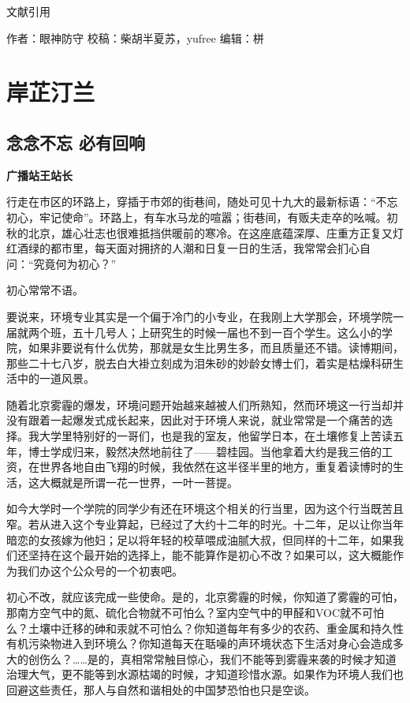 \documentclass[]{book}
\begin{document}
文献引用

作者：眼神防守 校稿：柴胡半夏苏，yufree 编辑：栟

\chapter{岸芷汀兰}

\section{念念不忘 必有回响}\label{-}

\textbf{广播站王站长}

行走在市区的环路上，穿插于市郊的街巷间，随处可见十九大的最新标语：``不忘初心，牢记使命''。环路上，有车水马龙的喧嚣；街巷间，有贩夫走卒的吆喊。初秋的北京，雄心壮志也很难抵挡供暖前的寒冷。在这座底蕴深厚、庄重方正复又灯红酒绿的都市里，每天面对拥挤的人潮和日复一日的生活，我常常会扪心自问：``究竟何为初心？''

初心常常不语。

要说来，环境专业其实是一个偏于冷门的小专业，在我刚上大学那会，环境学院一届就两个班，五十几号人；上研究生的时候一届也不到一百个学生。这么小的学院，如果非要说有什么优势，那就是女生比男生多，而且质量还不错。读博期间，那些二十七八岁，脱去白大褂立刻成为泪朱砂的妙龄女博士们，着实是枯燥科研生活中的一道风景。

随着北京雾霾的爆发，环境问题开始越来越被人们所熟知，然而环境这一行当却并没有跟着一起爆发式成长起来，因此对于环境人来说，就业常常是一个痛苦的选择。我大学里特别好的一哥们，也是我的室友，他留学日本，在土壤修复上苦读五年，博士学成归来，毅然决然地前往了------碧桂园。当他拿着大约是我三倍的工资，在世界各地自由飞翔的时候，我依然在这半径半里的地方，重复着读博时的生活，这大概就是所谓一花一世界，一叶一菩提。

如今大学时一个学院的同学少有还在环境这个相关的行当里，因为这个行当既苦且窄。若从进入这个专业算起，已经过了大约十二年的时光。十二年，足以让你当年暗恋的女孩嫁为他妇；足以将年轻的校草喂成油腻大叔，但同样的十二年，如果我们还坚持在这个最开始的选择上，能不能算作是初心不改？如果可以，这大概能作为我们办这个公众号的一个初衷吧。

初心不改，就应该完成一些使命。是的，北京雾霾的时候，你知道了雾霾的可怕，那南方空气中的氮、硫化合物就不可怕么？室内空气中的甲醛和VOC就不可怕么？土壤中迁移的砷和汞就不可怕么？你知道每年有多少的农药、重金属和持久性有机污染物进入到环境么？你知道每天在聒噪的声环境状态下生活对身心会造成多大的创伤么？\ldots{}\ldots{}是的，真相常常触目惊心，我们不能等到雾霾来袭的时候才知道治理大气，更不能等到水源枯竭的时候，才知道珍惜水源。如果作为环境人我们也回避这些责任，那人与自然和谐相处的中国梦恐怕也只是空谈。
\end{document}
